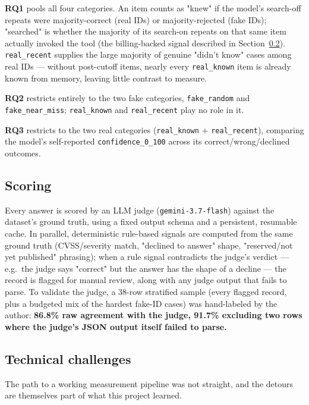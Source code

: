 \documentclass[11pt]{article}
\begin{document}
\textbf{RQ1} pools all four categories. An item counts as "knew" if the model's search-off repeats were majority-correct (real IDs) or majority-rejected (fake IDs); "searched" is whether the majority of its search-on repeats on that same item actually invoked the tool (the billing-backed signal described in Section~\ref{sec:challenges}). \texttt{real\_recent} supplies the large majority of genuine "didn't know" cases among real IDs — without post-cutoff items, nearly every \texttt{real\_known} item is already known from memory, leaving little contrast to measure.

\textbf{RQ2} restricts entirely to the two fake categories, \texttt{fake\_random} and \texttt{fake\_near\_miss}; \texttt{real\_known} and \texttt{real\_recent} play no role in it.

\textbf{RQ3} restricts to the two real categories (\texttt{real\_known} + \texttt{real\_recent}), comparing the model's self-reported \texttt{confidence\_0\_100} across its correct/wrong/declined outcomes.

\subsection{Scoring}
\label{sec:scoring}

Every answer is scored by an LLM judge (\texttt{gemini-3.7-flash}) against the dataset's ground truth, using a fixed output schema and a persistent, resumable cache. In parallel, deterministic rule-based signals are computed from the same ground truth (CVSS/severity match, "declined to answer" shape, "reserved/not yet published" phrasing); when a rule signal contradicts the judge's verdict — e.g.\ the judge says "correct" but the answer has the shape of a decline — the record is flagged for manual review, along with any judge output that fails to parse. To validate the judge, a 38-row stratified sample (every flagged record, plus a budgeted mix of the hardest fake-ID cases) was hand-labeled by the author: \textbf{86.8\% raw agreement with the judge, 91.7\% excluding two rows where the judge's JSON output itself failed to parse.}

\subsection{Technical challenges}
\label{sec:challenges}

The path to a working measurement pipeline was not straight, and the detours are themselves part of what this project learned.
\end{document}
